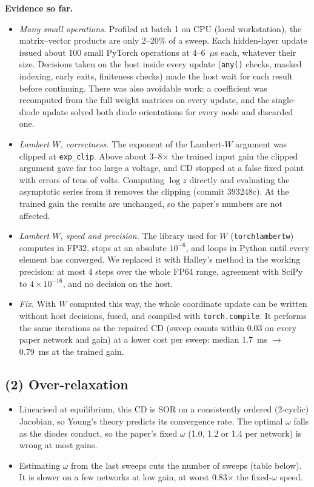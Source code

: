 \documentclass[11pt,a4paper]{article}
\newcommand{\evidence}{\par\noindent\textbf{Evidence so far.}\par}
\begin{document}
\evidence
\begin{itemize}
\item \emph{Many small operations.} Profiled at batch 1 on CPU (local
workstation), the matrix--vector products are only 2--20\% of a sweep. Each
hidden-layer update issued about 100 small PyTorch operations at
4--6~$\mu$s each, whatever their size. Decisions taken on the host inside
every update (\texttt{any()} checks, masked indexing, early exits,
finiteness checks) made the host wait for each result before continuing.
There was also avoidable work: a coefficient was recomputed from the full
weight matrices on every update, and the single-diode update solved both
diode orientations for every node and discarded one.
\item \emph{Lambert $W$, correctness.} The exponent of the Lambert-$W$
argument was clipped at \texttt{exp\_clip}. Above about 3--8$\times$ the
trained input gain the clipped argument gave far too large a voltage, and
CD stopped at a false fixed point with errors of tens of volts. Computing
$\log z$ directly and evaluating the asymptotic series from it removes the
clipping (commit 393248c). At the trained gain the results are unchanged,
so the paper's numbers are not affected.
\item \emph{Lambert $W$, speed and precision.} The library used for $W$
(\texttt{torchlambertw}) computes in FP32, stops at an absolute $10^{-6}$,
and loops in Python until every element has converged. We replaced it with
Halley's method in the working precision: at most 4 steps over the whole
FP64 range, agreement with SciPy to $4\times10^{-16}$, and no decision on
the host.
\item \emph{Fix.} With $W$ computed this way, the whole coordinate update
can be written without host decisions, fused, and compiled with
\texttt{torch.compile}. It performs the same iterations as the repaired
CD (sweep counts within 0.03 on every paper network and gain) at a lower
cost per sweep: median 1.7~ms $\to$ 0.79~ms at the trained gain.
\end{itemize}

\subsection*{(2) Over-relaxation}

\begin{itemize}
\item Linearised at equilibrium, this CD is SOR on a consistently ordered
(2-cyclic) Jacobian, so Young's theory predicts its convergence rate. The
optimal $\omega$ falls as the diodes conduct, so the paper's fixed
$\omega$ (1.0, 1.2 or 1.4 per network) is wrong at most gains.
\item Estimating $\omega$ from the last sweeps cuts the number of sweeps
(table below). It is slower on a few networks at low gain, at worst
0.83$\times$ the fixed-$\omega$ speed.
\end{itemize}
\end{document}
